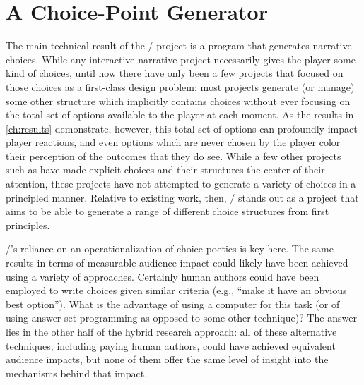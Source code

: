 \section{A Choice-Point Generator}

The main technical result of the \dunyazad/ project is a program that generates narrative choices.
%
While any interactive narrative project necessarily gives the player some kind of choices, until now there have only been a few projects that focused on those choices as a first-class design problem: most projects generate (or manage) some other structure which implicitly contains choices without ever focusing on the total set of options available to the player at each moment.
%
As the results in \cref{ch:results} demonstrate, however, this total set of options can profoundly impact player reactions, and even options which are never chosen by the player color their perception of the outcomes that they do see.
%
While a few other projects such as \citep{Barber2007a, Yu2013} have made explicit choices and their structures the center of their attention, these projects have not attempted to generate a variety of choices in a principled manner.
%
Relative to existing work, then, \dunyazad/ stands out as a project that aims to be able to generate a range of different choice structures from first principles.


\dunyazad/'s reliance on an operationalization of choice poetics is key here.
%
The same results in terms of measurable audience impact could likely have been achieved using a variety of approaches.
%
Certainly human authors could have been employed to write choices given similar criteria (e.g., ``make it have an obvious best option'').
%
What is the advantage of using a computer for this task (or of using answer-set programming as opposed to some other technique)?
%
The answer lies in the other half of the hybrid research approach: all of these alternative techniques, including paying human authors, could have achieved equivalent audience impacts, but none of them offer the same level of insight into the mechanisms behind that impact.


